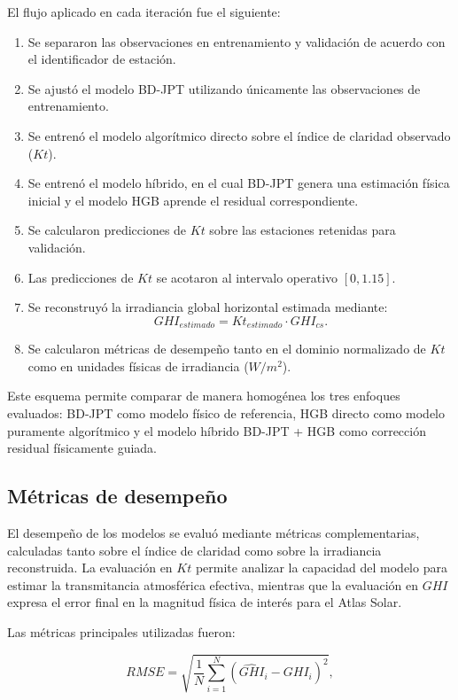 \documentclass[../main.tex]{subfiles}
\begin{document}
El flujo aplicado en cada iteración fue el siguiente:

\begin{enumerate}
\item Se separaron las observaciones en entrenamiento y validación de acuerdo con el identificador de estación.
\item Se ajustó el modelo BD-JPT utilizando únicamente las observaciones de entrenamiento.
\item Se entrenó el modelo algorítmico directo sobre el índice de claridad observado ($Kt$).
\item Se entrenó el modelo híbrido, en el cual BD-JPT genera una estimación física inicial y el modelo HGB aprende el residual correspondiente.
\item Se calcularon predicciones de $Kt$ sobre las estaciones retenidas para validación.
\item Las predicciones de $Kt$ se acotaron al intervalo operativo $[0, 1.15]$.
\item Se reconstruyó la irradiancia global horizontal estimada mediante:
\begin{equation}
GHI_{estimado} = Kt_{estimado} \cdot GHI_{cs}.
\end{equation}
\item Se calcularon métricas de desempeño tanto en el dominio normalizado de $Kt$ como en unidades físicas de irradiancia ($W/m^2$).
\end{enumerate}

Este esquema permite comparar de manera homogénea los tres enfoques evaluados: BD-JPT como modelo físico de referencia, HGB directo como modelo puramente algorítmico y el modelo híbrido BD-JPT + HGB como corrección residual físicamente guiada.

\subsection{Métricas de desempeño}

El desempeño de los modelos se evaluó mediante métricas complementarias, calculadas tanto sobre el índice de claridad como sobre la irradiancia reconstruida. La evaluación en $Kt$ permite analizar la capacidad del modelo para estimar la transmitancia atmosférica efectiva, mientras que la evaluación en $GHI$ expresa el error final en la magnitud física de interés para el Atlas Solar.

Las métricas principales utilizadas fueron:

\begin{equation}
RMSE =
\sqrt{
\frac{1}{N}
\sum_{i=1}^{N}
\left(
\hat{GHI}_i - GHI_i
\right)^2
},
\end{equation}
\end{document}
